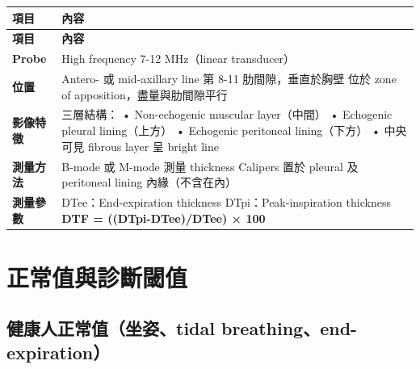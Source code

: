 \documentclass[12pt,a4paper]{article}
\begin{document}
\begin{longtable}{p{4cm}p{10cm}}
\toprule
\textbf{項目} & \textbf{內容} \\
\midrule
\endfirsthead

\toprule
\textbf{項目} & \textbf{內容} \\
\midrule
\endhead

\bottomrule
\endfoot

\textbf{Probe} & High frequency 7-12 MHz（linear transducer）\\
\midrule
\textbf{位置} & Antero- 或 mid-axillary line\newline
第 8-11 肋間隙，垂直於胸壁\newline
位於 zone of apposition，盡量與肋間隙平行 \\
\midrule
\textbf{影像特徵} & 三層結構：\newline
• Non-echogenic muscular layer（中間）\newline
• Echogenic pleural lining（上方）\newline
• Echogenic peritoneal lining（下方）\newline
• 中央可見 fibrous layer 呈 bright line \\
\midrule
\textbf{測量方法} & B-mode 或 M-mode 測量 thickness\newline
Calipers 置於 pleural 及 peritoneal lining 內緣（不含在內）\\
\midrule
\textbf{測量參數} & DTee：End-expiration thickness\newline
DTpi：Peak-inspiration thickness\newline
\textbf{DTF = ((DTpi-DTee)/DTee) × 100} \\
\bottomrule
\end{longtable}

\section{正常值與診斷閾值}

\subsection{健康人正常值（坐姿、tidal breathing、end-expiration）}
\end{document}
